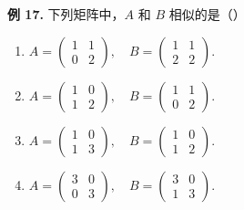 \begin{problemblock}
\textbf{例 17.} 下列矩阵中，\(A\) 和 \(B\) 相似的是（\quad）
\begin{enumerate}[label=\Alph*.]
\item \(A=\begin{pmatrix}1&1\\0&2\end{pmatrix},\quad B=\begin{pmatrix}1&1\\2&2\end{pmatrix}\).
\item \(A=\begin{pmatrix}1&0\\1&2\end{pmatrix},\quad B=\begin{pmatrix}1&1\\0&2\end{pmatrix}\).
\item \(A=\begin{pmatrix}1&0\\1&3\end{pmatrix},\quad B=\begin{pmatrix}1&0\\1&2\end{pmatrix}\).
\item \(A=\begin{pmatrix}3&0\\0&3\end{pmatrix},\quad B=\begin{pmatrix}3&0\\1&3\end{pmatrix}\).
\end{enumerate}
\end{problemblock}
\begin{solutionblock}
\end{solutionblock}

